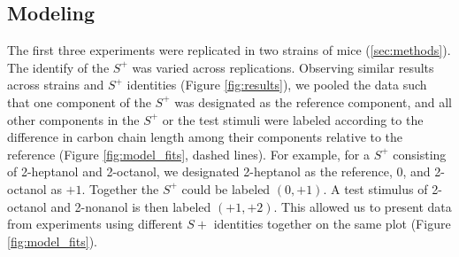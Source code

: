 \subsection{Modeling}
\label{results_models}
The first three experiments were replicated in two strains of mice (\ref{sec:methods}). 
The identify of the $S^+$ was varied across replications.  
Observing similar results across strains and $S^+$ identities (Figure \ref{fig:results}), we pooled the data such that one component of the $S^+$ was designated as the reference component, and all other components in the $S^+$ or the test stimuli were labeled according to the difference in carbon chain length among their components relative to the reference (Figure \ref{fig:model_fits}, dashed lines).  
For example, for a $S^+$ consisting of 2-heptanol and 2-octanol, we designated 2-heptanol as the reference, $0$, and 2-octanol as $+1$.  
Together the $S^+$ could be labeled $(0,+1)$.  
A test stimulus of 2-octanol and 2-nonanol is then labeled $(+1,+2)$.  
This allowed us to present data from experiments using different $S+$ identities together on the same plot (Figure \ref{fig:model_fits}).  